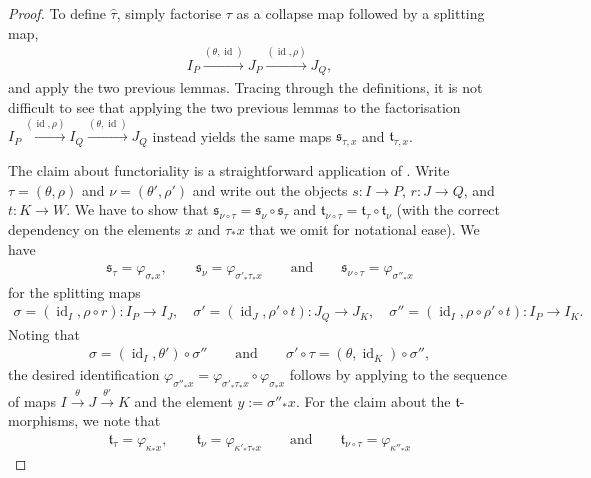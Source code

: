 \documentclass[12pt, reqno]{amsart}
\theoremstyle{plain}
\theoremstyle{definition}
\renewcommand{\phi}{\varphi}
\begin{document}
\begin{proof}
To define $\hat{\tau}$, simply factorise $\tau$ as a collapse map followed by a splitting map, \begin{align*}
I_P\xrightarrow{(\theta,\operatorname{id})} J_P\xrightarrow{(\operatorname{id},\rho)} J_Q,
\end{align*}
and apply the two previous lemmas. Tracing through the definitions, it is not difficult to see that applying the two previous lemmas to the factorisation $I_P\xrightarrow{(\operatorname{id},\rho)}I_Q\xrightarrow{(\theta, \operatorname{id})}J_Q$ instead yields the same maps $\mathfrak{s}_{\tau,x}$ and $\mathfrak{t}_{\tau,x}$.

The claim about functoriality is a straightforward application of . Write $\tau=(\theta, \rho)$ and $\nu=(\theta',\rho')$ and write out the objects $s\colon I\rightarrow P$, $r\colon J\rightarrow Q$, and $t\colon K\rightarrow W$. We have to show that $\mathfrak{s}_{\nu\circ \tau}=\mathfrak{s}_{\nu}\circ \mathfrak{s}_{\tau}$ and $\mathfrak{t}_{\nu\circ\tau}= \mathfrak{t}_{\tau}\circ \mathfrak{t}_{\nu}$ (with the correct dependency on the elements $x$ and $\tau_*x$ that we omit for notational ease). We have
\begin{align*}
\mathfrak{s}_{\tau}=\phi_{\sigma_*x},\qquad \mathfrak{s}_{\nu}=\phi_{\sigma'_*\tau_*x}\qquad\text{and}\qquad \mathfrak{s}_{\nu\circ\tau}=\phi_{\sigma''_*x}
\end{align*}
for the splitting maps
\begin{align*}
\sigma=(\operatorname{id}_I,\rho\circ r)\colon I_P\rightarrow I_J,\quad\sigma'=(\operatorname{id}_J,\rho'\circ t)\colon J_Q\rightarrow J_K,\quad\sigma''=(\operatorname{id}_I, \rho\circ\rho'\circ t)\colon I_P\rightarrow I_K.
\end{align*}
Noting that
\begin{align*}
\sigma= (\operatorname{id}_I,\theta')\circ \sigma''\qquad\text{and}\qquad \sigma'\circ\tau=(\theta,\operatorname{id}_K)\circ \sigma'',
\end{align*}
the desired identification $\phi_{\sigma''_*x} =\phi_{\sigma'_*\tau_*x}\circ\phi_{\sigma_*x}$ follows by applying  to the sequence of maps $I\xrightarrow{\theta}J\xrightarrow{\theta'} K$ and the element $y:=\sigma''_*x$. For the claim about the $\mathfrak{t}$-morphisms, we note that
\begin{align*}
\mathfrak{t}_{\tau}=\phi_{\kappa_*x},\qquad \mathfrak{t}_{\nu}=\phi_{\kappa'_*\tau_*x}\qquad\text{and}\qquad \mathfrak{t}_{\nu\circ \tau}=\phi_{\kappa''_*x}

\end{align*}
\end{proof}
\end{document}
